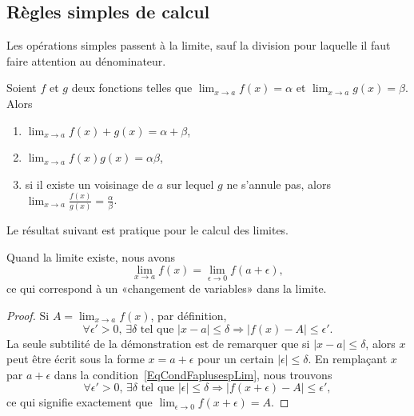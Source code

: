 \subsection{Règles simples de calcul}

Les opérations simples passent à la limite, sauf la division pour laquelle il faut faire attention au dénominateur.
\begin{proposition}     \label{PropOpsSimplesLimites}
    Soient \( f\) et \( g\) deux fonctions telles que \( \lim_{x\to a} f(x)=\alpha\) et \( \lim_{x\to a} g(x)=\beta\). Alors
    \begin{enumerate}
        \item
            \( \lim_{x\to a} f(x)+g(x)=\alpha+\beta\),
        \item
            \( \lim_{x\to a} f(x)g(x)=\alpha\beta\),
        \item
            si il existe un voisinage de \( a\) sur lequel \( g\) ne s'annule pas, alors \( \lim_{x\to a} \frac{ f(x) }{ g(x) }=\frac{ \alpha }{ \beta }\).
    \end{enumerate}
\end{proposition}

Le résultat suivant est pratique pour le calcul des limites.
\begin{proposition}     \label{PropChmVarLim}
Quand la limite existe, nous avons
\[
  \lim_{x\to a}f(x)=\lim_{\epsilon\to 0}f(a+\epsilon),
\]
ce qui correspond à un «changement de variables» dans la limite.
\end{proposition}

\begin{proof}
Si $A=\lim_{x\to a}f(x)$, par définition,
\begin{equation}        \label{EqCondFaplusespLim}
\forall\epsilon'>0,\,\exists\delta\text{ tel que }| x-a |\leq\delta\Rightarrow| f(x)-A |\leq\epsilon'.
\end{equation}
La seule subtilité de la démonstration est de remarquer que si $| x-a |\leq\delta$, alors $x$ peut être écrit sous la forme $x=a+\epsilon$ pour un certain $| \epsilon |\leq\delta$. En remplaçant $x$ par $a+\epsilon$ dans la condition~\ref{EqCondFaplusespLim}, nous trouvons
\begin{equation}
\forall\epsilon'>0,\,\exists\delta\text{ tel que }| \epsilon |\leq\delta\Rightarrow| f(x+\epsilon)-A |\leq\epsilon',
\end{equation}
ce qui signifie exactement que $\lim_{\epsilon\to 0}f(x+\epsilon)=A$.
\end{proof}

